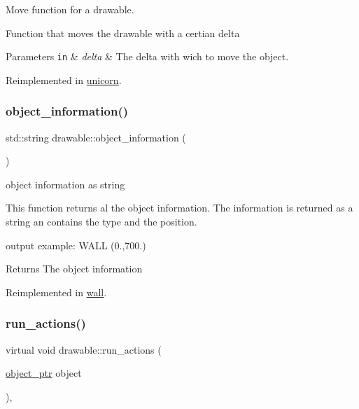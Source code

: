 Move function for a drawable. 

Function that moves the drawable with a certian delta


\begin{DoxyParams}[1]{Parameters}
\mbox{\tt in}  & {\em delta} & The delta with wich to move the object. \\
\hline
\end{DoxyParams}


Reimplemented in \hyperlink{classunicorn_a162f200a68342f7bc0baaf17c8cf3f9f}{unicorn}.

\mbox{\label{classdrawable_a2ed0f8bb53f33477f7722efa7bb24583}} 
\subsubsection{\texorpdfstring{object\+\_\+information()}{object\_information()}}
{\footnotesize\ttfamily std\+::string drawable\+::object\+\_\+information (\begin{DoxyParamCaption}{ }\end{DoxyParamCaption})\hspace{0.3cm}{\ttfamily [virtual]}}



object information as string 

This function returns al the object information. The information is returned as a string an contains the type and the position.

output example\+: W\+A\+LL (0.,700.) \begin{DoxyReturn}{Returns}
The object information 
\end{DoxyReturn}


Reimplemented in \hyperlink{classwall_aab1de4f144f176b134a967ba08747932}{wall}.

\mbox{\label{classdrawable_a715df01a318331e5611a2b0ad30109ff}} 
\subsubsection{\texorpdfstring{run\+\_\+actions()}{run\_actions()}}
{\footnotesize\ttfamily virtual void drawable\+::run\+\_\+actions (\begin{DoxyParamCaption}\item[{\hyperlink{drawable_8hpp_aab5add95f06d2ba25dbfed8eb07274fa}{object\+\_\+ptr}}]{object }\end{DoxyParamCaption})\hspace{0.3cm}{\ttfamily [inline]}, {\ttfamily [virtual]}}



